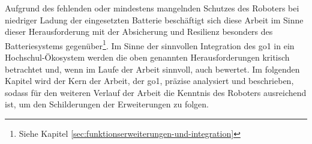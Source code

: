 Aufgrund des fehlenden oder mindestens mangelnden Schutzes des Roboters bei niedriger Ladung der eingesetzten Batterie
beschäftigt sich diese Arbeit im Sinne dieser Herausforderung mit der Absicherung und Resilienz besonders des Batteriesystems
gegenüber\footnote{Siehe Kapitel \ref{sec:funktionserweiterungen-und-integration}}.
Im Sinne der sinnvollen Integration des \gls{go1} in ein Hochschul-Ökosystem werden die oben genannten Herausforderungen
kritisch betrachtet und, wenn im Laufe der Arbeit sinnvoll, auch bewertet.
Im folgenden Kapitel wird der Kern der Arbeit, der \gls{go1}, präzise analysiert und beschrieben, sodass für den
weiteren Verlauf der Arbeit die Kenntnis des Roboters ausreichend ist, um den Schilderungen der Erweiterungen zu folgen.

